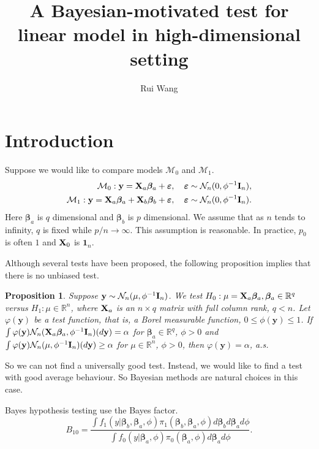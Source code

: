 \documentclass[11pt]{article}
\title{
A Bayesian-motivated test for linear model in high-dimensional setting
}
\author[1]{Rui Wang}
\newcommand{\By}{\mathbf{y}}    \newcommand{\Bz}{\mathbf{z}}
\newcommand{\bfsym}[1]{\ensuremath{\boldsymbol{#1}}}
\def\bbeta{\bfsym \beta}
\theoremstyle{plain}
\newtheorem{proposition}{\quad\quad Proposition}
\theoremstyle{definition}
\theoremstyle{remark}
\begin{document}
\maketitle
\section{Introduction} 
Suppose we would like to compare models $\mathcal M_0$ and $\mathcal M_1$.
\begin{align*}
    \mathcal M_0:   \By = \BX_a \bbeta_a + \bepsilon,\quad \bepsilon\sim \mathcal N_n(0,\phi^{-1} \BI_n),
    \\
    \mathcal M_1:   \By = \BX_a \bbeta_a + \BX_b \bbeta_b + \bepsilon,\quad \bepsilon\sim \mathcal N_n(0,\phi^{-1} \BI_n).
\end{align*}
Here $\bbeta_a$ is $q$ dimensional and $\bbeta_b$ is $p$ dimensional.
We assume that as $n$ tends to infinity, $q$ is fixed while $p/n \to \infty$.
This assumption is reasonable.
In practice, $p_0$ is often $1$ and $\mathbf{X}_0$ is $\mathbf 1_n$.


Although several tests have been proposed, the following proposition implies that there is no unbiased test.
\begin{proposition}\label{prop:unbiased}
Suppose
$\By\sim \mathcal N_n (\mu, \phi^{-1}\BI_n)$.
We test $H_0: \mu=\BX_a \bbeta_a, \bbeta_a \in \mathbb R^q$ versus
$H_1: \mu\in \mathbb R^n$, where $\mathbf{X}_a$ is an $n\times q$ matrix with full column rank, $q<n$.
Let $\varphi(\By)$ be a test function, that is, a Borel measurable function, $0\leq \phi(\By)\leq 1$.
If $\int\varphi(\By) \mathcal N_n (\BX_a\bbeta_a, \phi^{-1} \BI_n) (d\By)=\alpha$ for $\bbeta_a \in \mathbb R^q$, $\phi>0$ and $\int\varphi(\By) \mathcal N_n (\mu, \phi^{-1} \BI_n) (d\By) \geq \alpha$ for $\mu\in \mathbb R^n$, $\phi>0$, then $\varphi(\By)=\alpha$, a.s.
\end{proposition}

So we can not find a universally good test.
Instead, we would like to find a test with good average behaviour.
So Bayesian methods are natural choices in this case.




Bayes hypothesis testing use the Bayes factor.
\begin{equation*}
    B_{10}= \frac {
        \int f_1(y|\bbeta_b ,\bbeta_a, \phi) \pi_1(\bbeta_b,\bbeta_a,\phi) d\bbeta_b d\bbeta_a d\phi
}{
        \int f_0(y|\bbeta_a, \phi) \pi_0(\bbeta_a,\phi) d\bbeta_a d\phi
    }.
\end{equation*}
\end{document}
